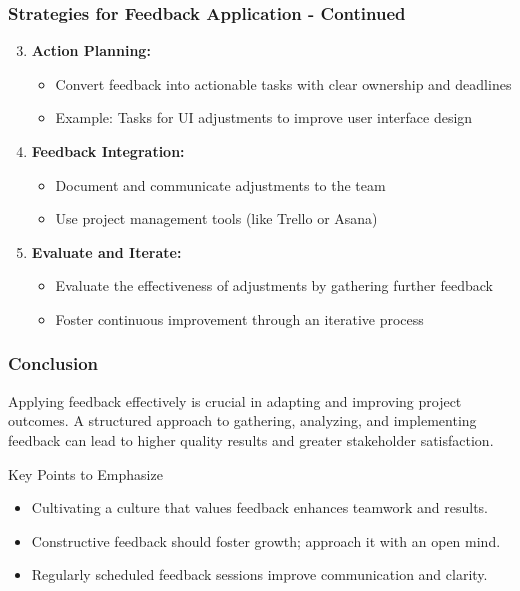 \documentclass[aspectratio=169]{beamer}
\begin{document}
\begin{frame}[fragile]
    \frametitle{Strategies for Feedback Application - Continued}
    \begin{enumerate}
        \setcounter{enumi}{2} %
        
        \item \textbf{Action Planning:}
        \begin{itemize}
            \item Convert feedback into actionable tasks with clear ownership and deadlines
            \item Example: Tasks for UI adjustments to improve user interface design
        \end{itemize}
        
        \item \textbf{Feedback Integration:}
        \begin{itemize}
            \item Document and communicate adjustments to the team
            \item Use project management tools (like Trello or Asana)
        \end{itemize}
        
        \item \textbf{Evaluate and Iterate:}
        \begin{itemize}
            \item Evaluate the effectiveness of adjustments by gathering further feedback
            \item Foster continuous improvement through an iterative process
        \end{itemize}
    \end{enumerate}
\end{frame}

\begin{frame}[fragile]
    \frametitle{Conclusion}
    Applying feedback effectively is crucial in adapting and improving project outcomes. A structured approach to gathering, analyzing, and implementing feedback can lead to higher quality results and greater stakeholder satisfaction.

    \begin{block}{Key Points to Emphasize}
        \begin{itemize}
            \item Cultivating a culture that values feedback enhances teamwork and results.
            \item Constructive feedback should foster growth; approach it with an open mind.
            \item Regularly scheduled feedback sessions improve communication and clarity.
        \end{itemize}
    \end{block}
\end{frame}
\end{document}
